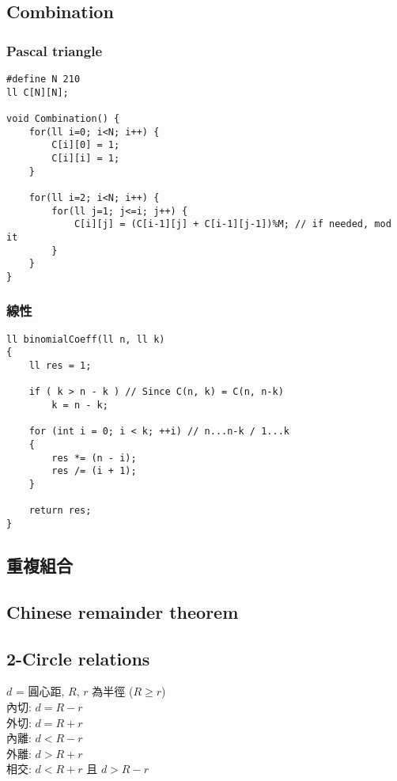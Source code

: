 \documentclass[10pt,oneside]{article}
\begin{document}
\begin{landscape}
\begin{multicols}{2}
\subsection{Combination}

\subsubsection{Pascal triangle}

\begin{lstlisting}
#define N 210
ll C[N][N];

void Combination() {
    for(ll i=0; i<N; i++) {
        C[i][0] = 1;
        C[i][i] = 1;
    }

    for(ll i=2; i<N; i++) {
        for(ll j=1; j<=i; j++) {
            C[i][j] = (C[i-1][j] + C[i-1][j-1])%M; // if needed, mod it
        }
    }
}
\end{lstlisting}

\subsubsection{線性}

\begin{lstlisting}
ll binomialCoeff(ll n, ll k)
{
    ll res = 1;
 
    if ( k > n - k ) // Since C(n, k) = C(n, n-k)
        k = n - k;
 
    for (int i = 0; i < k; ++i) // n...n-k / 1...k
    {
        res *= (n - i);
        res /= (i + 1);
    }
 
    return res;
}
\end{lstlisting}

\subsection{重複組合}

\subsection{Chinese remainder theorem}


\subsection{2-Circle relations}

$d$ = 圓心距, $R$, $r$ 為半徑 ($R \geq r$)\\
內切: $d = R - r$\\
外切: $d = R + r$\\
內離: $d < R - r$\\
外離: $d > R + r$\\
相交: $d < R + r$ 且 $d > R - r$


\end{multicols}
\end{landscape}
\end{document}
